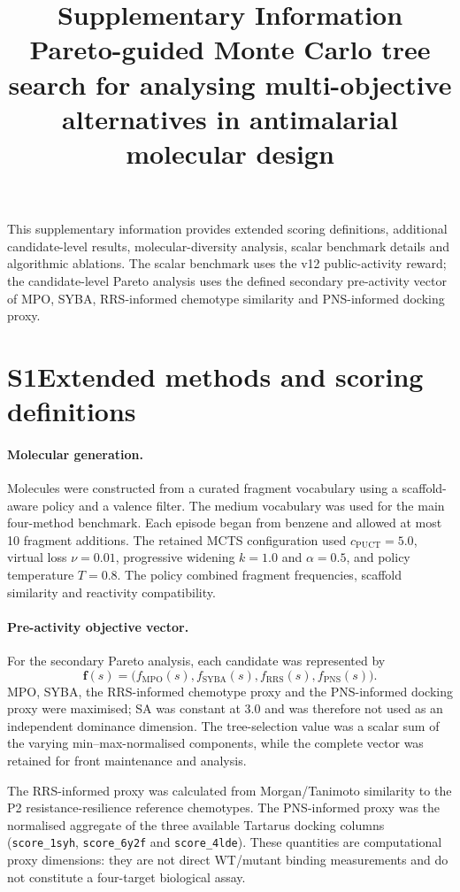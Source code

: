 \documentclass[10pt,a4paper]{article}
\title{\textbf{Supplementary Information}\\[0.4em]
\large Pareto-guided Monte Carlo tree search for analysing multi-objective
alternatives in antimalarial molecular design}
\author{}
\date{}
\begin{document}
\maketitle

This supplementary information provides extended scoring definitions, additional candidate-level results, molecular-diversity analysis, scalar benchmark details and algorithmic ablations. The scalar benchmark uses the v12 public-activity reward; the candidate-level Pareto analysis uses the defined secondary pre-activity vector of MPO, SYBA, RRS-informed chemotype similarity and PNS-informed docking proxy.

\section*{S1\hspace{0.6em}Extended methods and scoring definitions}

\paragraph{Molecular generation.}
Molecules were constructed from a curated fragment vocabulary using a
scaffold-aware policy and a valence filter. The medium vocabulary was used for
the main four-method benchmark. Each episode began from benzene and allowed at
most \num{10} fragment additions. The retained MCTS configuration used
$c_{\mathrm{PUCT}}=\num{5.0}$, virtual loss $\nu=\num{0.01}$, progressive
widening $k=\num{1.0}$ and $\alpha=\num{0.5}$, and policy temperature
$T=\num{0.8}$. The policy combined fragment frequencies, scaffold similarity
and reactivity compatibility.

\paragraph{Pre-activity objective vector.}
For the secondary Pareto analysis, each candidate was represented by
\[
  \mathbf{f}(s)=\bigl(f_{\mathrm{MPO}}(s),f_{\mathrm{SYBA}}(s),
  f_{\mathrm{RRS}}(s),f_{\mathrm{PNS}}(s)\bigr).
\]
MPO, SYBA, the RRS-informed chemotype proxy and the PNS-informed docking
proxy were maximised; SA was constant at \num{3.0} and was therefore not
used as an independent dominance dimension. The tree-selection value was a
scalar sum of the varying min--max-normalised components, while the complete
vector was retained for front maintenance and analysis.

The RRS-informed proxy was calculated from Morgan/Tanimoto similarity to the
P2 resistance-resilience reference chemotypes. The PNS-informed proxy was the
normalised aggregate of the three available Tartarus docking columns
(\texttt{score\_1syh}, \texttt{score\_6y2f} and \texttt{score\_4lde}). These
quantities are computational proxy dimensions: they are not direct WT/mutant
binding measurements and do not constitute a four-target biological assay.
\end{document}
